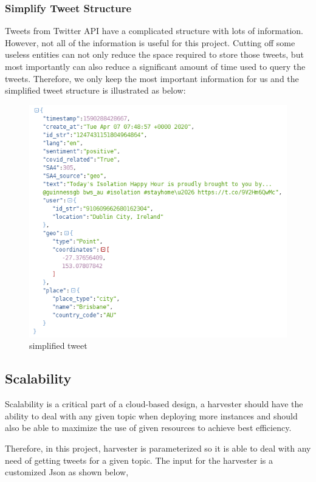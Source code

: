 \subsubsection{Simplify Tweet Structure}
Tweets from Twitter API have a complicated structure with lots of information. However, not all of the information is useful for this project. Cutting off some useless entities can not only reduce the space required to store those tweets, but most importantly can also reduce a significant amount of time used to query the tweets. Therefore, we only keep the most important information for us and the simplified tweet structure is illustrated as below:

\begin{figure}[H]
\centering
\includegraphics[scale=0.7]{city_analytics/report/images/simplifiedtweet.png}
\caption{simplified tweet}
\label{fig:stream}
\end{figure}


\subsection{Scalability}

Scalability is a critical part of a cloud-based design, a harvester should have the ability to deal with any given topic when deploying more instances and should also be able to maximize the use of given resources to achieve best efficiency.

Therefore, in this project, harvester is parameterized so it is able to deal with any need of getting tweets for a given topic. The input for the harvester is a customized Json as shown below,

